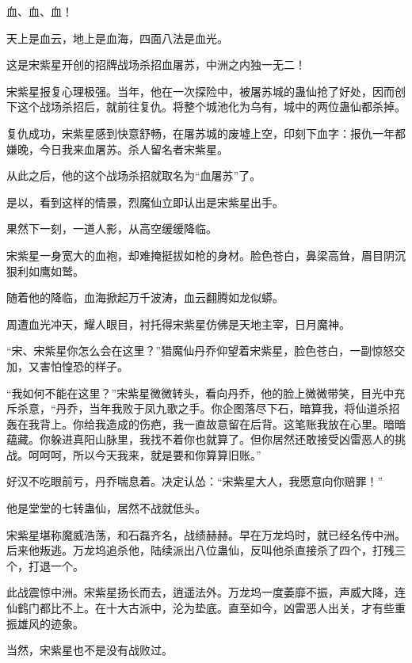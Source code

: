 
\begin{this_body}



血、血、血！

天上是血云，地上是血海，四面八法是血光。

这是宋紫星开创的招牌战场杀招血屠苏，中洲之内独一无二！

宋紫星报复心理极强。当年，他在一次探险中，被屠苏城的蛊仙抢了好处，因而创下这个战场杀招后，就前往复仇。将整个城池化为乌有，城中的两位蛊仙都杀掉。

复仇成功，宋紫星感到快意舒畅，在屠苏城的废墟上空，印刻下血字：报仇一年都嫌晚，今日我来血屠苏。杀人留名者宋紫星。

从此之后，他的这个战场杀招就取名为“血屠苏”了。

是以，看到这样的情景，烈魔仙立即认出是宋紫星出手。

果然下一刻，一道人影，从高空缓缓降临。

宋紫星一身宽大的血袍，却难掩挺拔如枪的身材。脸色苍白，鼻梁高耸，眉目阴沉狠利如鹰如鹫。

随着他的降临，血海掀起万千波涛，血云翻腾如龙似蟒。

周遭血光冲天，耀人眼目，衬托得宋紫星仿佛是天地主宰，日月魔神。

“宋、宋紫星你怎么会在这里？”猎魔仙丹乔仰望着宋紫星，脸色苍白，一副惊怒交加，又害怕惶恐的样子。

“我如何不能在这里？”宋紫星微微转头，看向丹乔，他的脸上微微带笑，目光中充斥杀意，“丹乔，当年我败于凤九歌之手。你企图落尽下石，暗算我，将仙道杀招轰在我背上。你给我造成的伤疤，我一直故意留在后背。这笔账我放在心里。暗暗蕴藏。你躲进真阳山脉里，我找不着你也就算了。但你居然还敢接受凶雷恶人的挑战。呵呵呵，所以今天我来，就是要和你算算旧账。”

好汉不吃眼前亏，丹乔喘息着。决定认怂：“宋紫星大人，我愿意向你赔罪！”

他是堂堂的七转蛊仙，居然不战就低头。

宋紫星堪称魔威浩荡，和石磊齐名，战绩赫赫。早在万龙坞时，就已经名传中洲。后来他叛逃。万龙坞追杀他，陆续派出八位蛊仙，反叫他杀直接杀了四个，打残三个，打退一个。

此战震惊中洲。宋紫星扬长而去，逍遥法外。万龙坞一度萎靡不振，声威大降，连仙鹤门都比不上。在十大古派中，沦为垫底。直至如今，凶雷恶人出关，才有些重振雄风的迹象。

当然，宋紫星也不是没有战败过。


\end{this_body}
